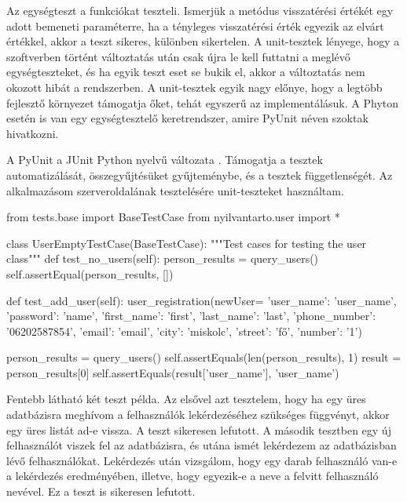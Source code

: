 Az egységteszt a funkciókat teszteli. Ismerjük a metódus visszatérési értékét egy adott bemeneti paraméterre, ha a tényleges visszatérési érték egyezik az elvárt értékkel, akkor a teszt sikeres, különben sikertelen. A unit-tesztek lényege, hogy a szoftverben történt változtatás után csak újra le kell futtatni a meglévő egységteszteket, és ha egyik teszt eset se bukik el, akkor a változtatás nem okozott hibát a rendszerben.
A unit-tesztek egyik nagy előnye, hogy a legtöbb fejlesztő környezet támogatja őket, tehát egyszerű az implementálásuk. A Phyton esetén is van egy egységtesztelő keretrendszer, amire PyUnit néven szoktak hivatkozni.

A PyUnit a JUnit Python nyelvű változata \cite{python_test}. Támogatja a tesztek automatizálását, összegyűjtésüket gyűjteménybe, és a tesztek függetlenségét. Az alkalmazásom szerveroldalának tesztelésére unit-teszteket használtam.

\begin{python}
 from tests.base import BaseTestCase
from nyilvantarto.user import *


class UserEmptyTestCase(BaseTestCase):
 """Test cases for testing the user class"""
    def test_no_users(self):
        person_results = query_users()
        self.assertEqual(person_results, [])

    def test_add_user(self):
        user_registration(newUser=
                          {'user_name': 'user_name', 'password': 'name', 'first_name': 'first', 'last_name': 'last',
                           'phone_number': '06202587854', 'email': 'email', 'city': 'miskolc', 'street': 'fő',
                           'number': '1'})

        person_results = query_users()
        self.assertEquals(len(person_results), 1)
        result = person_results[0]
        self.assertEquals(result['user_name'], 'user_name')

\end{python}

Fentebb látható két teszt példa. Az elsővel azt tesztelem, hogy ha egy üres adatbázisra meghívom a felhasználók lekérdezéséhez szükséges függvényt, akkor egy üres listát ad-e vissza. A teszt sikeresen lefutott. A második tesztben egy új felhasználót viszek fel az adatbázisra, és utána ismét lekérdezem az adatbázisban lévő felhasználókat. Lekérdezés után vizsgálom, hogy egy darab felhasználó van-e a lekérdezés eredményében, illetve, hogy egyezik-e a neve a felvitt felhasználó nevével. Ez a teszt is sikeresen lefutott.

